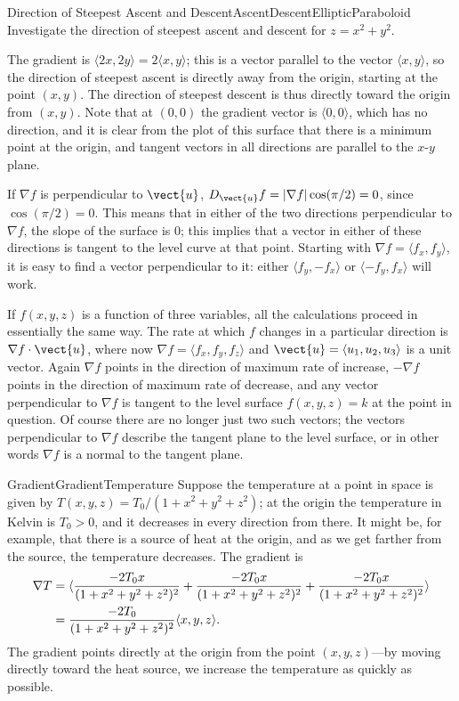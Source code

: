 \begin{example}{Direction of Steepest Ascent and Descent}{AscentDescentEllipticParaboloid}
Investigate the direction of steepest ascent and descent for
$z=x^2+y^2$.
\end{example}
\begin{solution}
The gradient is $\langle 2x,2y\rangle=2\langle x,y\rangle$; this is a
vector parallel to the vector $\langle x,y\rangle$, so the direction
of steepest ascent is directly away from the origin, starting at the
point $(x,y)$. The direction of steepest descent is thus directly
toward the origin from $(x,y)$. Note that at $(0,0)$ the gradient
vector is $\langle 0,0\rangle$, which has no direction, and it is
clear from the plot of this surface that there is a minimum point at
the origin, and tangent vectors in all directions are parallel to the
$x$-$y$ plane.
\end{solution}

If $\nabla f$ is perpendicular to $\vect{u}$, 
$D_{\vect{u}}f=|\nabla f|\cos(\pi/2)=0$, since $\cos(\pi/2)=0$.
This means that in either of the two directions perpendicular to
$\nabla f$, the slope of the surface is 0; this implies that a vector in
either of these directions is tangent to the level curve at that
point. Starting with $\nabla f=\langle f_x,f_y\rangle$, it is easy to
find a vector perpendicular to it: either $\langle f_y,-f_x\rangle$ or 
$\langle -f_y,f_x\rangle$ will work.

If $f(x,y,z)$ is a function of three variables, all the calculations
proceed in essentially the same way. The rate at which $f$ changes in
a particular direction is $\nabla f\cdot\vect{u}$, where now
$\nabla f=\langle f_x,f_y,f_z\rangle$ and $\vect{u}=\langle
u_1,u_2,u_3\rangle$ is a unit vector. Again $\nabla f$ points in the
direction of maximum rate of increase, $-\nabla f$ points in the
direction of maximum rate of decrease, and any vector perpendicular to
$\nabla f$ is tangent to the level surface $f(x,y,z)=k$ at the point
in question. Of course there are no longer just two such vectors; the
vectors perpendicular to $\nabla f$ describe the tangent plane to the
level surface, or in other words $\nabla f$ is a normal to the tangent
plane. 

\begin{example}{Gradient}{GradientTemperature}
Suppose the temperature at a point in space is given by
$T(x,y,z)=T_0/(1+x^2+y^2+z^2)$; at the origin the temperature in
Kelvin is
$T_0>0$, and it decreases in every direction from there. It might be,
for example, that there is a source of heat at the origin, and as we
get farther from the source, the temperature decreases.
The gradient is
\begin{align*}
\nabla T&=\langle {-2T_0x\over (1+x^2+y^2+z^2)^2}+
{-2T_0x\over (1+x^2+y^2+z^2)^2}+{-2T_0x\over (1+x^2+y^2+z^2)^2}\rangle	\\
&={-2T_0\over (1+x^2+y^2+z^2)^2}\langle x,y,z\rangle.	\\
\end{align*}
The gradient points directly at the origin from the point
$(x,y,z)$---by moving directly toward the heat source, we increase the
temperature as quickly as possible.
\end{example}

